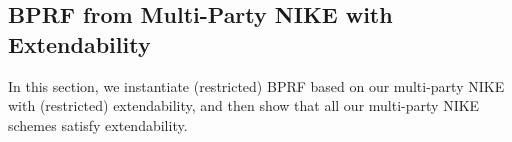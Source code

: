 	
%	

\subsection{BPRF from Multi-Party NIKE with Extendability}
\label{sec:munike-bprf}
In this section, we instantiate (restricted) BPRF based on our multi-party NIKE with (restricted) extendability, and then show that all our multi-party NIKE schemes satisfy extendability.

